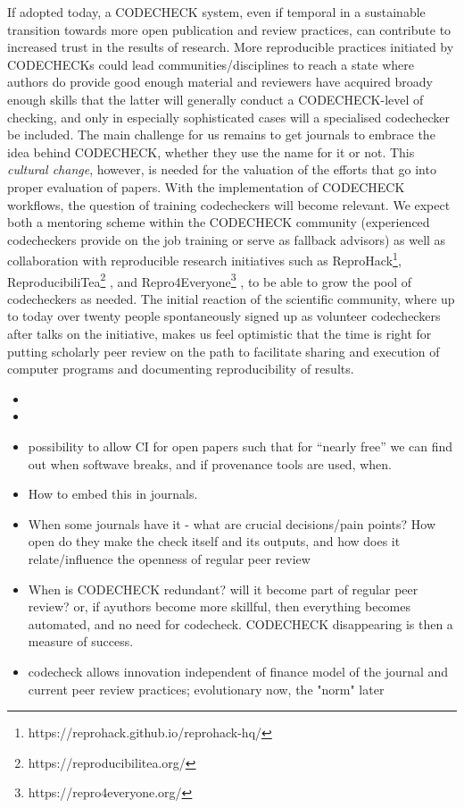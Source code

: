 \documentclass[12pt]{article}
\begin{document}
If adopted today, a CODECHECK system, even if temporal in a sustainable 
transition towards more open publication and review practices, can contribute
to increased trust in the results of research.
More reproducible practices initiated by CODECHECKs could lead
communities/disciplines to reach a state where authors do provide good
enough material and reviewers have acquired broady enough skills that
the latter will generally conduct a CODECHECK-level of checking, and
only in especially sophisticated cases will a specialised codechecker
be included.
The main challenge for us remains to get journals to embrace the
idea behind CODECHECK, whether they use the name for it or not.
This \emph{cultural change}, however, is needed for the valuation of the
efforts that go into proper evaluation of papers.
With the implementation of CODECHECK workflows, the question of training
codecheckers will become relevant. We expect both a mentoring scheme within
the CODECHECK community (experienced codecheckers provide on the job training
or serve as fallback advisors) as well as collaboration with reproducible
research initiatives such as
ReproHack\footnote{https://reprohack.github.io/reprohack-hq/},
ReproducibiliTea\footnote{https://reproducibilitea.org/}
\cite{fitzgibbon_brewing_2020},
and Repro4Everyone\footnote{https://repro4everyone.org/}
\cite{auer_reproducibility_2020},
to be able to grow the pool of codecheckers as needed.
The initial reaction of the scientific community, where up to today over 
twenty people spontaneously signed up as volunteer codecheckers after talks
on the initiative, makes us feel optimistic that the time is right for 
putting scholarly peer review on the path to facilitate sharing and execution
of computer programs and documenting reproducibility of results.


\begin{itemize}
\item
  
\item 
  
\item
  possibility to allow CI for open papers such that for ``nearly free''
  we can find out when softwave breaks, and if provenance tools are
  used, when.
\item
  How to embed this in journals.
\item
  When some journals have it - what are crucial decisions/pain points?
  How open do they make the check itself and its outputs, and how does it
  relate/influence the openness of regular peer review
\item
  When is CODECHECK redundant? will it become part of regular peer
  review? or, if ayuthors become more skillful, then everything becomes
  automated, and no need for codecheck. CODECHECK disappearing is then a
  measure of success.
\item
  codecheck allows innovation independent of finance model of the journal
  and current peer review practices; evolutionary now, the "norm" later
\end{itemize}
\end{document}
